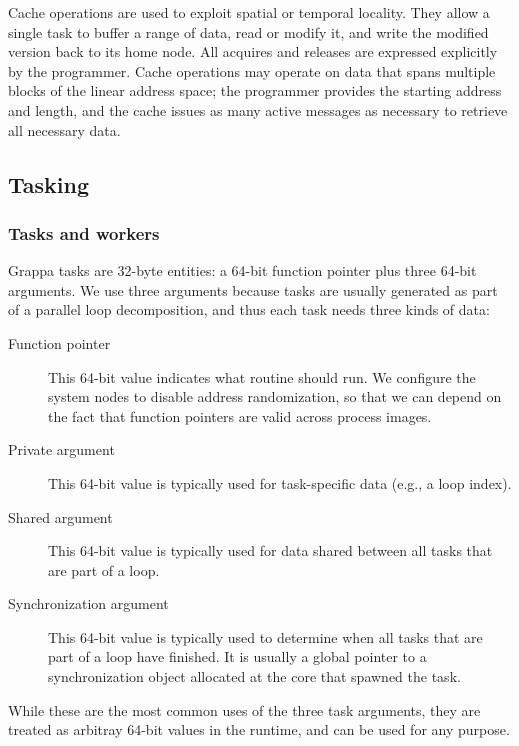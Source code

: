 Cache operations are used to exploit spatial or temporal
locality. They allow a single task to buffer a range of data, read or
modify it, and write the modified version back to its home node. All
acquires and releases are expressed explicitly by the
programmer. Cache operations may operate on data that spans multiple
blocks of the linear address space; the programmer provides the
starting address and length, and the cache issues as many active
messages as necessary to retrieve all necessary data.



\subsection{Tasking}

\subsubsection{Tasks and workers}

Grappa tasks are 32-byte entities: a 64-bit function pointer plus
three 64-bit arguments. We use three arguments because tasks are
usually generated as part of a parallel loop decomposition, and thus
each task needs three kinds of data:
\begin{description}
\item[Function pointer] This 64-bit value indicates what routine
  should run. We configure the system nodes to disable address randomization, so that we can depend on the fact that function pointers are valid across process images.
\item[Private argument] This 64-bit value is typically used for task-specific
  data (e.g., a loop index).
\item[Shared argument] This 64-bit value is typically used for data shared
  between all tasks that are part of a loop.
\item[Synchronization argument] This 64-bit value is typically used to determine
  when all tasks that are part of a loop have finished. It is usually
  a global pointer to a synchronization object allocated at the core
  that spawned the task.
\end{description}
While these are the most common uses of the three task arguments, they
are treated as arbitray 64-bit values in the runtime, and can be used
for any purpose.

